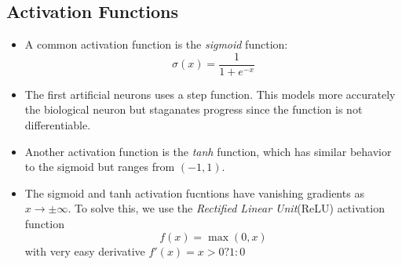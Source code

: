 \documentclass[a4paper]{article}
\numberwithin{equation}{section}
\begin{document}
\subsection{Activation Functions}
\begin{itemize}
    \item A common activation function is the \textit{sigmoid} function:
    \begin{equation}
        \sigma(x)=\frac{1}{1+e^{-x}}
    \end{equation}
    \begin{center}
    \end{center}
    \item The first artificial neurons uses a step function. This models more accurately the biological neuron but staganates progress since the function is not differentiable.
    \begin{center}
    \end{center}
    \item Another activation function is the \textit{tanh} function, which has similar behavior to the sigmoid but ranges from $(-1,1)$.
    \item The sigmoid and tanh activation fucntions have vanishing gradients as $x\to\pm\infty$. To solve this, we use the \textit{Rectified Linear Unit}(ReLU) activation function
    \begin{equation}
        f(x) = \max(0,x)
    \end{equation}
    with very easy derivative $f'(x) = x>0 ? 1 : 0$
    \begin{center}
    \end{center}
\end{itemize}
\end{document}
